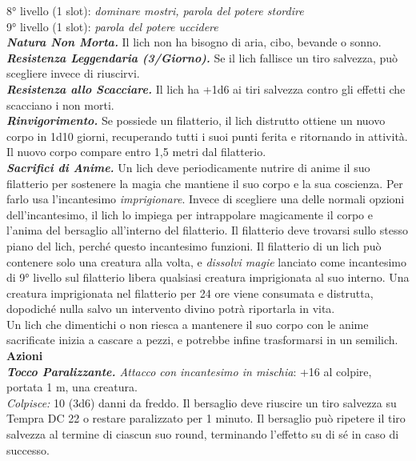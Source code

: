 \begin{multicols}{2}
8° livello (1 slot): \emph{dominare mostri, parola del potere stordire}\\
9° livello (1 slot): \emph{parola del potere uccidere}\\
\emph{\textbf{Natura Non Morta.}} Il lich non ha bisogno di aria, cibo, bevande o sonno.\\
\emph{\textbf{Resistenza Leggendaria (3/Giorno).}} Se il lich fallisce un tiro salvezza, può scegliere invece di riuscirvi.\\
\emph{\textbf{Resistenza allo Scacciare.}} Il lich ha +1d6 ai tiri salvezza contro gli effetti che scacciano i non morti.\\
\emph{\textbf{Rinvigorimento.}} Se possiede un filatterio, il lich distrutto ottiene un nuovo corpo in 1d10 giorni, recuperando tutti i suoi punti ferita e ritornando in attività. Il nuovo corpo compare entro 1,5 metri dal filatterio.\\

\emph{\textbf{Sacrifici di Anime.}} Un lich deve periodicamente nutrire di anime il suo filatterio per sostenere la magia che mantiene il suo corpo e la sua coscienza. Per farlo usa l'incantesimo \emph{imprigionare}. Invece di scegliere una delle normali opzioni dell'incantesimo, il lich lo impiega per intrappolare magicamente il corpo e l'anima del bersaglio all'interno del filatterio. Il filatterio deve trovarsi sullo stesso piano del lich, perché questo incantesimo funzioni. Il filatterio di un lich può contenere solo una creatura alla volta, e \emph{dissolvi magie} lanciato come incantesimo di 9° livello sul filatterio libera qualsiasi creatura imprigionata al suo interno. Una creatura imprigionata nel filatterio per 24 ore viene consumata e distrutta, dopodiché nulla salvo un intervento divino potrà riportarla in vita.\\
Un lich che dimentichi o non riesca a mantenere il suo corpo con le anime sacrificate inizia a cascare a pezzi, e potrebbe infine trasformarsi in un semilich.\\

\smallskip\textbf{Azioni}\\

\emph{\textbf{Tocco Paralizzante.} Attacco con incantesimo in mischia}: +16 al colpire, portata 1 m, una creatura.\\

\emph{Colpisce:} 10 (3d6) danni da freddo. Il bersaglio deve riuscire un tiro salvezza su Tempra DC  22 o restare paralizzato per 1 minuto. Il bersaglio può ripetere il tiro salvezza al termine di ciascun suo round, terminando l'effetto su di sé in caso di successo.\\


\end{multicols}
